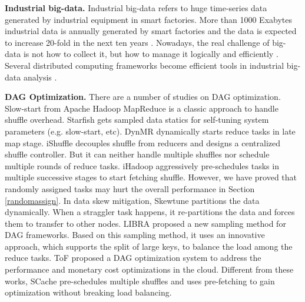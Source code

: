 {\textbf{Industrial big-data.}
Industrial big-data refers to huge time-series data generated by industrial equipment in smart factories.
More than 1000 Exabytes industrial data is annually generated by smart factories and the data is expected to increase 20-fold in the next ten years \cite{yin2015big}.
Nowadays, the real challenge of big-data is not how to collect it, but how to manage it logically and efficiently \cite{lv2017next}.
Several distributed computing frameworks become efficient tools in industrial big-data analysis \cite{lade2017manufacturing, li2016scientific, ur2018big}.
}

{\color{blue}
\textbf{DAG Optimization.} 
There are a number of studies on DAG optimization.
Slow-start from Apache Hadoop MapReduce is a classic approach to handle shuffle overhead. 
Starfish \cite{starfish} gets sampled data statics for self-tuning system parameters (e.g. slow-start, etc). 
DynMR \cite{dynmr} dynamically starts reduce tasks in late map stage. 
iShuffle \cite{guo2017ishuffle} decouples shuffle from reducers and designs a centralized shuffle controller. 
But it can neither handle multiple shuffles nor schedule multiple rounds of reduce tasks. 
iHadoop \cite{ihadoop} aggressively pre-schedules tasks in multiple successive stages to start fetching shuffle. 
However, we have proved that randomly assigned tasks may hurt the overall performance in Section \ref{randomassign}. 
In data skew mitigation, 
Skewtune \cite{skewtune} partitions the data dynamically. When a straggler task happens, it re-partitions the data and forces them to transfer to other nodes.
LIBRA \cite{chen2014libra} proposed a new sampling method for DAG frameworks. Based on this sampling method, it uses an innovative approach, which supports the split of large keys, to balance the load among the reduce tasks.
ToF \cite{zhou2014transformation} proposed a DAG optimization system to address the performance and monetary cost optimizations in the cloud.
Different from these works, SCache pre-schedules multiple shuffles and uses pre-fetching to gain optimization without breaking load balancing. 
}
